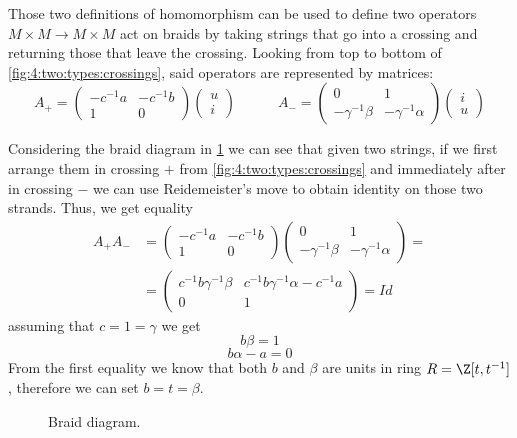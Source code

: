 Those two definitions of homomorphism can be used to define two operators $M\times M\to M\times M$ act on braids by taking strings that go into a crossing and returning those that leave the crossing. Looking from top to bottom of \cref{fig:4:two:types:crossings}, said operators are represented by matrices:
$$
A_+=\begin{pmatrix}
  -c^{-1}a & -c^{-1}b \\
  1 & 0
\end{pmatrix}
\begin{pmatrix}u\\i\end{pmatrix}
\quad\quad\quad
A_-=\begin{pmatrix}
  0 & 1 \\ 
  -\gamma^{-1}\beta & -\gamma^{-1}\alpha
\end{pmatrix}
\begin{pmatrix}i\\u\end{pmatrix}
$$

Considering the braid diagram in \cref{fig:5:first:braid:relation} we can see that given two strings, if we first arrange them in crossing $+$ from \cref{fig:4:two:types:crossings} and immediately after in crossing $-$ we can use Reidemeister's move to obtain identity on those two strands. Thus, we get equality
\begin{align*}
  A_+A_-&=\begin{pmatrix}-c^{-1}a&-c^{-1}b\\ 1 & 0\end{pmatrix}\begin{pmatrix}0&1\\-\gamma^{-1}\beta&-\gamma^{-1}\alpha\end{pmatrix}=\\ 
        &=\begin{pmatrix}c^{-1}b\gamma^{-1}\beta & c^{-1}b\gamma^{-1}\alpha-c^{-1}a\\ 0& 1\end{pmatrix}=Id
\end{align*}
assuming that $c=1=\gamma$ we get
$$b\beta=1$$
$$b\alpha-a=0$$
From the first equality we know that both $b$ and $\beta$ are units in ring $R=\Z[t, t^{-1}]$, therefore we can set $b=t=\beta$.
\begin{figure}[h]\centering 
  \caption{\label{fig:5:first:braid:relation}Braid diagram.}
\end{figure}

